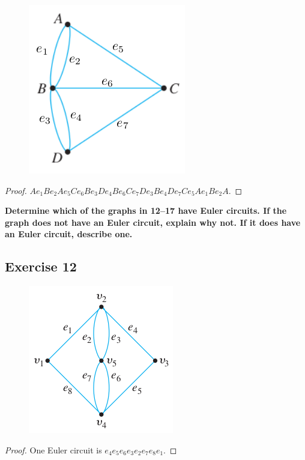 \documentclass[14pt]{extarticle}
\newcommand{\cy}{\color{cyan}}
\begin{document}
\begin{figure}[ht!]
    \centering
    \includegraphics[scale=0.5]{../images/10.1.11.png}
\end{figure}

\begin{proof}
    \(Ae_1Be_2Ae_5Ce_6Be_3De_4Be_6Ce_7De_3Be_4De_7Ce_5Ae_1Be_2A\).
\end{proof}

{\bf \cy Determine which of the graphs in 12–17 have Euler circuits. If the graph does not have an Euler circuit, explain
why not. If it does have an Euler circuit, describe one.}

\subsection{Exercise 12}
\begin{figure}[ht!]
    \centering
    \includegraphics[scale=0.4]{../images/10.1.12.png}
\end{figure}

\begin{proof}
    One Euler circuit is \(e_4e_5e_6e_3e_2e_7e_8e_1\).
\end{proof}
\end{document}
